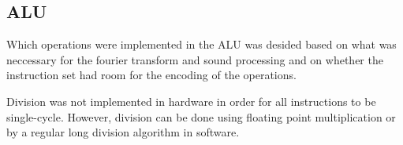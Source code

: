 \FloatBarrier
\subsection{ALU}\label{sec:fpga-alu}

Which operations were implemented in the ALU was desided based on what
was neccessary for the fourier transform and sound processing and on
whether the instruction set had room for the encoding of the operations.

Division was not implemented in hardware in order for all instructions to be
single-cycle. However, division can be done using floating point multiplication
or by a regular long division algorithm in software.

%
%
%
%
